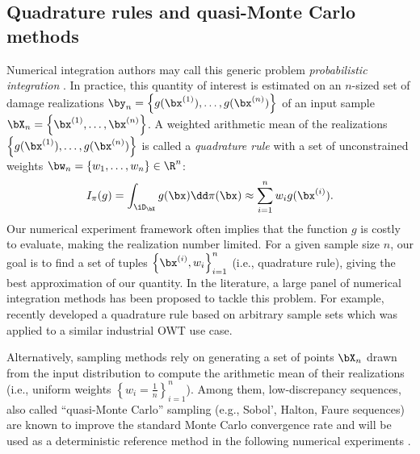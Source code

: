 \subsection{Quadrature rules and quasi-Monte Carlo methods}
Numerical integration authors may call this generic problem \emph{probabilistic integration} \citep{briol_oates_2019}. 
In practice, this quantity of interest is estimated on an $n$-sized set of damage realizations $\by_n = \left\{g(\bx^{(1)}), \dots, g(\bx^{(n)})\right\}$ of an input sample $\bX_n = \left\{\bx^{(1)}, \dots, \bx^{(n)}\right\}$. 
A weighted arithmetic mean of the realizations $\left\{g(\bx^{(1)}), \dots, g(\bx^{(n)})\right\}$ is called a \emph{quadrature rule} with a set of unconstrained weights $\bw_n = \{w_1, \dots, w_n\} \in \R^n$:
\begin{equation}
    I_{\pi}(g) = \int_{\iD_\bX} g(\bx) \dd\pi(\bx) \approx \sum_{i=1}^n w_i g(\bx^{(i)}).
    \label{eq:quadrature_rule}
\end{equation}
Our numerical experiment framework often implies that the function $g$ is costly to evaluate, making the realization number limited. 
For a given sample size $n$, our goal is to find a set of tuples $\left\{\bx^{(i)}, w_i \right\}_{i=1}^n$ (i.e., quadrature rule), giving the best approximation of our quantity. 
In the literature, a large panel of numerical integration methods has been proposed to tackle this problem. 
For example, \cite{bos_2020} recently developed a quadrature rule based on arbitrary sample sets which was applied to a similar industrial OWT use case.  

Alternatively, sampling methods rely on generating a set of points $\bX_n$ drawn from the input distribution to compute the arithmetic mean of their realizations (i.e., uniform weights $\left\{w_i = \frac1n \right\}_{i=1}^n$). 
Among them, low-discrepancy sequences, also called ``quasi-Monte Carlo'' sampling (e.g., Sobol', Halton, Faure sequences) are known to improve the standard Monte Carlo convergence rate and will be used as a deterministic reference method in the following numerical experiments \citep{leobacher_2014}.


